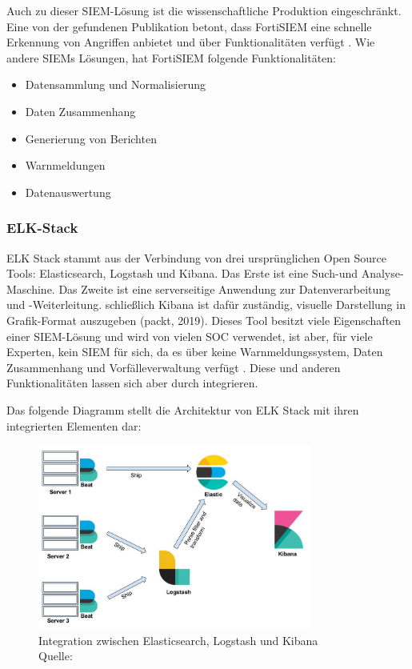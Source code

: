 \newpage
Auch zu dieser \gls{SIEM}-Lösung ist die wissenschaftliche Produktion eingeschränkt. Eine von der gefundenen Publikation betont, dass FortiSIEM eine schnelle Erkennung von Angriffen anbietet und über   Funktionalitäten verfügt \citep{Ramires_fortisiem}. Wie andere \glspl{SIEM} Lösungen, hat FortiSIEM folgende Funktionalitäten:

\begin{itemize}[noitemsep]
   \item Datensammlung und Normalisierung
   \item Daten Zusammenhang
   \item Generierung von Berichten
   \item Warnmeldungen
   \item Datenauswertung
\end{itemize}


\subsubsection{ELK-Stack}
ELK Stack stammt aus der Verbindung von drei ursprünglichen \gls{Open Source} Tools: Elasticsearch, Logstash und Kibana. Das Erste ist eine Such-und Analyse-Maschine. Das Zweite ist eine serverseitige Anwendung zur Datenverarbeitung und -Weiterleitung. schließlich Kibana \label{kibana} ist dafür zuständig, visuelle Darstellung in Grafik-Format auszugeben (packt, 2019). Dieses Tool besitzt viele Eigenschaften einer \gls{SIEM}-Lösung und wird von vielen SOC verwendet, ist aber, für viele Experten, kein \gls{SIEM} für sich, da es über keine Warnmeldungssystem, Daten Zusammenhang und Vorfälleverwaltung verfügt \citep{Miller_ELK}. Diese und anderen Funktionalitäten lassen sich aber durch  integrieren. 

\newpage
Das folgende Diagramm stellt die Architektur von ELK Stack mit ihren integrierten Elementen dar:

\begin{figure}[H]
   \centering
   \includegraphics[width=0.8\textwidth]{assets/2_p8.png}
   \caption{Integration zwischen Elasticsearch, Logstash und Kibana\\Quelle: \citep{packt_elkstack} }
   \centering
\end{figure}

